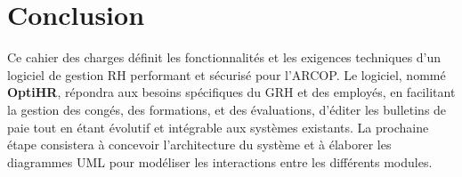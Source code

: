 \section{Conclusion}
Ce cahier des charges définit les fonctionnalités et les exigences techniques d'un logiciel de gestion RH performant et sécurisé pour l'ARCOP. Le logiciel, nommé \textbf{OptiHR}, répondra aux besoins spécifiques du GRH et des employés, en facilitant la gestion des congés, des formations, et des évaluations, d'éditer les bulletins de paie tout en étant évolutif et intégrable aux systèmes existants. La prochaine étape consistera à concevoir l'architecture du système et à élaborer les diagrammes UML pour modéliser les interactions entre les différents modules.
\clearpage
